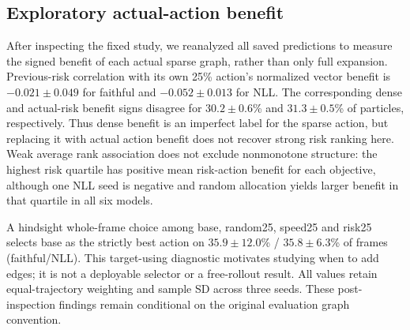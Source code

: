 \subsection{Exploratory actual-action benefit}
After inspecting the fixed study, we reanalyzed all saved predictions to measure
the signed benefit of each actual sparse graph, rather than only full expansion.
Previous-risk correlation with its own 25\% action's normalized vector benefit is
$-0.021\pm0.049$ for faithful and $-0.052\pm0.013$ for NLL.
The corresponding dense and actual-risk benefit signs disagree for
$30.2\pm0.6$\% and
$31.3\pm0.5$\% of particles, respectively.
Thus dense benefit is an imperfect label for the sparse action, but replacing
it with actual action benefit does not recover strong risk ranking here.
Weak average rank association does not exclude nonmonotone structure: the highest
risk quartile has positive mean risk-action benefit for each objective, although
one NLL seed is negative and random allocation yields larger benefit in that
quartile in all six models.

A hindsight whole-frame choice among base, random25, speed25 and risk25 selects
base as the strictly best action on $35.9\pm12.0$\% / $35.8\pm6.3$\% of frames (faithful/NLL).
This target-using diagnostic motivates studying when to add edges; it is not a
deployable selector or a free-rollout result. All values retain equal-trajectory
weighting and sample SD across three seeds. These post-inspection findings remain
conditional on the original evaluation graph convention.

